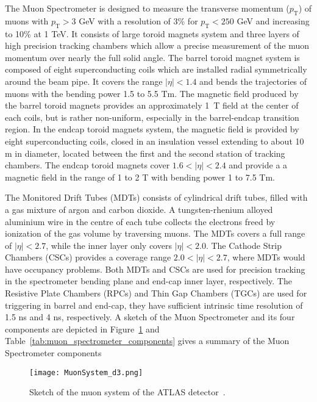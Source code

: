The Muon Spectrometer is designed to measure the transverse momentum ($p_{\mathrm{T}}$) of muons with $p_{\mathrm{T}} > 3$ GeV with a resolution of 3\% for $p_{\mathrm{T}} < 250$  GeV and increasing to 10\% at 1 TeV.
It consists of large toroid magnets system and three layers of high precision tracking chambers which allow a precise measurement of the muon momentum over nearly the full solid angle.
The barrel toroid magnet system is composed of eight superconducting coils which are installed radial symmetrically around the beam pipe.
It covers the range $|\eta| < 1.4$ and bends the trajectories of muons with the bending power 1.5 to 5.5 Tm.
The magnetic field produced by the barrel toroid magnets provides an approximately 1~T field at the center of each coils, but is rather non-uniform, especially in the barrel-endcap transition region.
In the endcap toroid magnets system, the magnetic field is provided by eight superconducting coils, closed in an insulation vessel extending to about 10 m in diameter, located between the first and the second station of tracking chambers.
The endcap toroid magnets cover $1.6 < |\eta| < 2.4$ and provide a a magnetic field in the range of 1 to 2 T with bending power 1 to 7.5 Tm.

The Monitored Drift Tubes (MDTs) consists of cylindrical drift tubes, filled with a gas mixture of argon and carbon dioxide.
A tungsten-rhenium alloyed aluminium wire in the centre of each tube collects the electrons freed by ionization of the gas volume by traversing muons.
The MDTs covers a full range of $|\eta| < 2.7$, while the inner layer only covers $|\eta| < 2.0$.
The Cathode Strip Chambers (CSCs) provides a coverage range $2.0 < |\eta| < 2.7$, where MDTs would have occupancy problems.
Both MDTs and CSCs are used for precision tracking in the spectrometer bending plane and end-cap inner layer, respectively.
The Resistive Plate Chambers (RPCs) and Thin Gap Chambers (TGCs) are used for triggering in barrel and end-cap, they have sufficient intrinsic time resolution of 1.5 ns and 4 ns, respectively.
A sketch of the Muon Spectrometer and its four components are depicted in Figure~\ref{fig:muon_spectrometer} and Table~\ref{tab:muon_spectrometer_components} gives a summary of the Muon Spectrometer components

\begin{figure}[htbp]
\begin{center}
\texttt{[image: MuonSystem\_d3.png]}
\caption{Sketch of the muon system of the ATLAS detector~\cite{1748-0221-3-08-S08003}.}
\label{fig:muon_spectrometer}
\end{center}
\end{figure}

